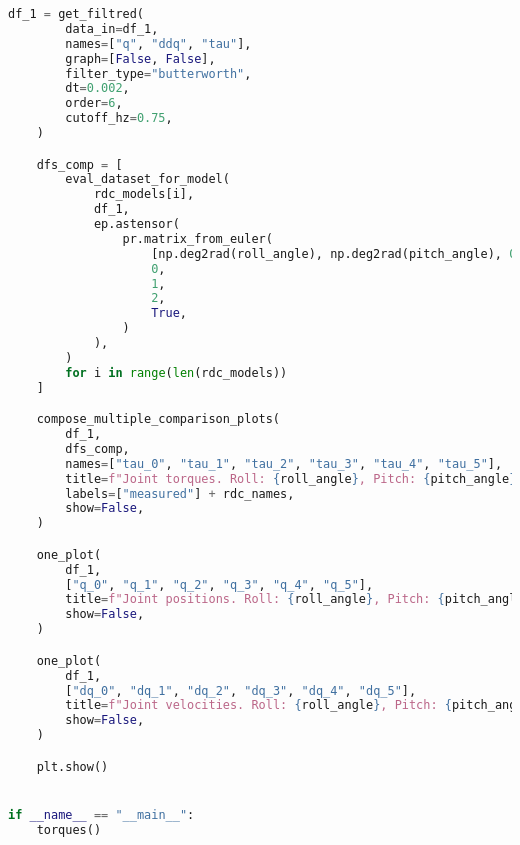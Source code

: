 \begin{lstlisting}[language=python, caption=\raggedright{verification/torques\_verification.py}, frame=single]
    df_1 = get_filtred(
        data_in=df_1,
        names=["q", "ddq", "tau"],
        graph=[False, False],
        filter_type="butterworth",
        dt=0.002,
        order=6,
        cutoff_hz=0.75,
    )

    dfs_comp = [
        eval_dataset_for_model(
            rdc_models[i],
            df_1,
            ep.astensor(
                pr.matrix_from_euler(
                    [np.deg2rad(roll_angle), np.deg2rad(pitch_angle), 0.0],
                    0,
                    1,
                    2,
                    True,
                )
            ),
        )
        for i in range(len(rdc_models))
    ]

    compose_multiple_comparison_plots(
        df_1,
        dfs_comp,
        names=["tau_0", "tau_1", "tau_2", "tau_3", "tau_4", "tau_5"],
        title=f"Joint torques. Roll: {roll_angle}, Pitch: {pitch_angle}",
        labels=["measured"] + rdc_names,
        show=False,
    )

    one_plot(
        df_1,
        ["q_0", "q_1", "q_2", "q_3", "q_4", "q_5"],
        title=f"Joint positions. Roll: {roll_angle}, Pitch: {pitch_angle}",
        show=False,
    )

    one_plot(
        df_1,
        ["dq_0", "dq_1", "dq_2", "dq_3", "dq_4", "dq_5"],
        title=f"Joint velocities. Roll: {roll_angle}, Pitch: {pitch_angle}",
        show=False,
    )

    plt.show()


if __name__ == "__main__":
    torques()

\end{lstlisting}